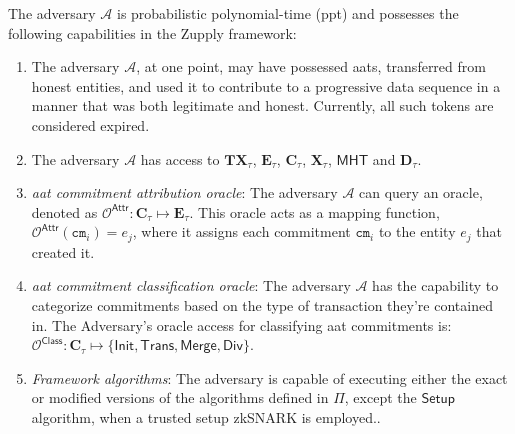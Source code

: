 \begin{definition}
\label{def:Adversary Assumptions}
The adversary $\mathcal{A}$ is probabilistic polynomial-time (\gls{ppt}) and possesses the following capabilities in the Zupply framework:
        \begin{enumerate}
            \item The adversary $\mathcal{A}$, at one point, may have possessed \gls{aat}s,  transferred from honest entities, and used it to contribute to a progressive data sequence in a manner that was both legitimate and honest. Currently, all such tokens are considered expired. 
            
            \item The adversary $\mathcal{A}$ has access to $\mathbf{TX}_\tau$, $\mathbf{E}_\tau$, $\mathbf{C}_\tau$,  $\mathbf{X}_\tau$, $\mathsf{MHT}$ and $\mathbf{D}_\tau$.
            
            \item \textit{\gls{aat} commitment attribution oracle}: The adversary $\mathcal{A}$ can query an oracle, denoted as $\mathcal{O}^\mathsf{Attr}: \mathbf{C}_\tau \mapsto \mathbf{E}_\tau$. This oracle acts as a mapping function, $\mathcal{O}^\mathsf{Attr}(\texttt{cm}_i) = e_j$, where it assigns each commitment $\texttt{cm}_i$ to the entity $e_j$ that created it. 
            
            \item \textit{\gls{aat} commitment classification oracle}: The adversary $\mathcal{A}$ has the capability to categorize commitments based on the type of transaction they're contained in. The Adversary's oracle access for classifying \gls{aat} commitments is:\\ $\mathcal{O}^\mathsf{Class}: \mathbf{C}_\tau \mapsto \{\textsf{Init}, \textsf{Trans}, \textsf{Merge}, \textsf{Div}\}$. 

            \item \textit{Framework algorithms}: The adversary  is capable of executing either the exact or modified versions of the algorithms defined in $\Pi$, except the $\mathsf{Setup}$ algorithm, when a trusted setup zkSNARK is employed..        
        \end{enumerate}

        \end{definition}



